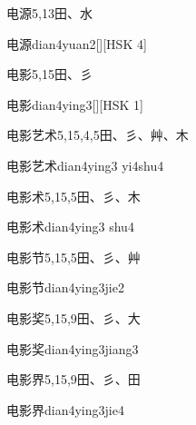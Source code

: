 \begin{entry}{电源}{5,13}{⽥、⽔}
  \begin{phonetics}{电源}{dian4yuan2}[][HSK 4]
  \end{phonetics}
\end{entry}

\begin{entry}{电影}{5,15}{⽥、⼺}
  \begin{phonetics}{电影}{dian4ying3}[][HSK 1]
  \end{phonetics}
\end{entry}

\begin{entry}{电影艺术}{5,15,4,5}{⽥、⼺、⾋、⽊}
  \begin{phonetics}{电影艺术}{dian4ying3 yi4shu4}
  \end{phonetics}
\end{entry}

\begin{entry}{电影术}{5,15,5}{⽥、⼺、⽊}
  \begin{phonetics}{电影术}{dian4ying3 shu4}
  \end{phonetics}
\end{entry}

\begin{entry}{电影节}{5,15,5}{⽥、⼺、⾋}
  \begin{phonetics}{电影节}{dian4ying3jie2}
  \end{phonetics}
\end{entry}

\begin{entry}{电影奖}{5,15,9}{⽥、⼺、⼤}
  \begin{phonetics}{电影奖}{dian4ying3jiang3}
  \end{phonetics}
\end{entry}

\begin{entry}{电影界}{5,15,9}{⽥、⼺、⽥}
  \begin{phonetics}{电影界}{dian4ying3jie4}
  \end{phonetics}
\end{entry}

